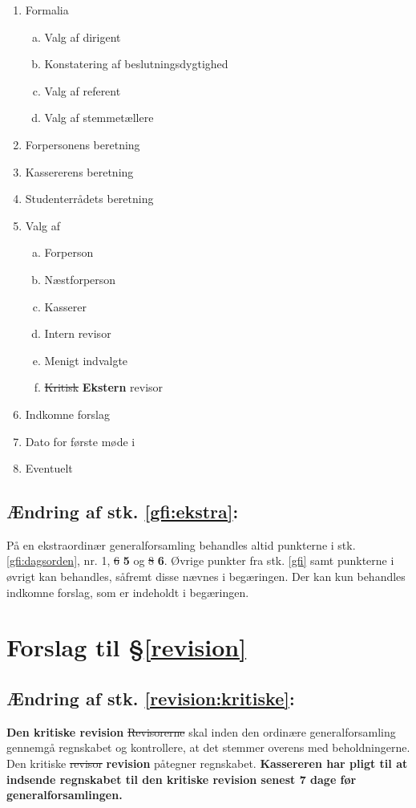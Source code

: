 \begin{enumerate}[1), nosep]
\item Formalia

	\begin{enumerate}[a., nosep]
	\item Valg af dirigent
	\item Konstatering af beslutningsdygtighed
	\item Valg af referent
	\item Valg af stemmetællere
	\end{enumerate}
\item Forpersonens beretning
\item Kassererens beretning
\item Studenterrådets beretning
\item Valg af
	\begin{enumerate}[a., nosep]
	\item Forperson
	\item Næstforperson
	\item Kasserer
	\item Intern revisor
	\item Menigt indvalgte
	\item \st{Kritisk} \textbf{Ekstern} revisor
	\end{enumerate}
\item Indkomne forslag
\item Dato for første møde i \fagr{}
\item Eventuelt
\end{enumerate}


\subsection*{Ændring af stk. \ref{gfi:ekstra}:}

På en ekstraordinær generalforsamling behandles altid punkterne i stk. \ref{gfi:dagsorden}, nr. 1, \st{6} \textbf{5} og \st{8} \textbf{6}. Øvrige punkter fra stk. \ref{gfi} samt punkterne i øvrigt kan behandles, såfremt disse nævnes i begæringen. Der kan kun behandles indkomne forslag, som er indeholdt i begæringen.

\section*{Forslag til §\ref{revision}}

\subsection*{Ændring af stk. \ref{revision:kritiske}:}

\textbf{Den kritiske revision} \st{Revisorerne} skal inden den ordinære generalforsamling gennemgå regnskabet og kontrollere, at det stemmer overens med beholdningerne. Den kritiske \st{revisor} \textbf{revision} påtegner regnskabet. \textbf{Kassereren har pligt til at indsende regnskabet til den kritiske revision senest 7 dage før generalforsamlingen.}
